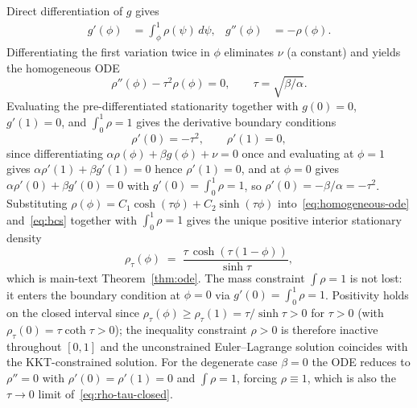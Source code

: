 Direct differentiation of $g$ gives
\begin{align}
g'(\phi)
&=
\int_\phi^1 \rho(\psi)\,d\psi,
&
g''(\phi)
&=
-\rho(\phi).
\end{align}
Differentiating the first variation twice in $\phi$ eliminates $\nu$ (a constant) and yields the homogeneous ODE
\begin{equation}
\rho''(\phi) - \tau^2\rho(\phi) = 0,\qquad \tau = \sqrt{\beta/\alpha}.
\label{eq:homogeneous-ode}
\end{equation}
Evaluating the pre-differentiated stationarity together with $g(0){=}0$, $g'(1){=}0$, and $\int_0^1\rho = 1$ gives the derivative boundary conditions
\begin{equation}
\rho'(0) = -\tau^2,\qquad \rho'(1) = 0,
\label{eq:bcs}
\end{equation}
since differentiating $\alpha\rho(\phi)+\beta g(\phi)+\nu = 0$ once and evaluating at $\phi{=}1$ gives $\alpha\rho'(1)+\beta g'(1) = 0$ hence $\rho'(1){=}0$, and at $\phi{=}0$ gives $\alpha\rho'(0)+\beta g'(0) = 0$ with $g'(0) = \int_0^1\rho = 1$, so $\rho'(0) = -\beta/\alpha = -\tau^2$. Substituting $\rho(\phi) = C_1\cosh(\tau\phi)+C_2\sinh(\tau\phi)$ into~\eqref{eq:homogeneous-ode} and~\eqref{eq:bcs} together with $\int_0^1\rho = 1$ gives the unique positive interior stationary density
\begin{equation}
\rho_\tau(\phi) \;=\; \frac{\tau\,\cosh(\tau(1-\phi))}{\sinh\tau},
\label{eq:rho-tau-closed}
\end{equation}
which is main-text Theorem~\ref{thm:ode}. The mass constraint $\int\rho{=}1$ is not lost: it enters the boundary condition at $\phi{=}0$ via $g'(0){=}\int_0^1\rho{=}1$. Positivity holds on the closed interval since $\rho_\tau(\phi){\geq}\rho_\tau(1){=}\tau/\sinh\tau{>}0$ for $\tau{>}0$ (with $\rho_\tau(0){=}\tau\coth\tau{>}0$); the inequality constraint $\rho{>}0$ is therefore inactive throughout $[0,1]$ and the unconstrained Euler--Lagrange solution coincides with the KKT-constrained solution. For the degenerate case $\beta{=}0$ the ODE reduces to $\rho''{=}0$ with $\rho'(0){=}\rho'(1){=}0$ and $\int\rho{=}1$, forcing $\rho\equiv 1$, which is also the $\tau{\to}0$ limit of~\eqref{eq:rho-tau-closed}.

